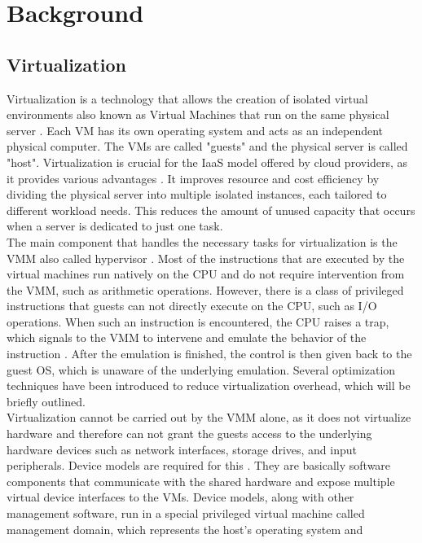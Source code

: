 \chapter{Background}\label{chapter:background}
\section{Virtualization}
Virtualization is a technology that allows the creation of isolated virtual environments also known as 
Virtual Machines that run on the same physical server \cite{virtualization_review}. Each VM has its own 
operating system and acts as an independent physical computer. The VMs are called "guests" and the 
physical server is called "host". Virtualization is crucial for the \ac{IaaS} model offered by 
cloud providers, as it provides various advantages \cite{virtualization_review}. It improves resource and 
cost efficiency by dividing the physical server into multiple isolated instances, each tailored to 
different workload needs. This reduces the amount of unused capacity that occurs when a server is dedicated 
to just one task. \\
The main component that handles the necessary tasks for virtualization is the \ac{VMM} 
also called hypervisor \cite{nitro_whitepaper}. Most of the instructions that are executed by the virtual 
machines run natively on the CPU and do not require intervention from the \acs{VMM}, such as arithmetic 
operations. 
However, there is a class of privileged instructions that guests can not directly execute on the CPU, 
such as I/O operations. When such an instruction is encountered, the CPU raises a 
trap, which signals to the \acs{VMM} to intervene and emulate the behavior of the instruction \cite{nitro_whitepaper}.  
After the emulation is finished, the control is then given back to the guest OS, 
which is unaware of the underlying emulation. Several optimization techniques have been introduced 
to reduce virtualization overhead, which will be briefly outlined. \\
Virtualization cannot be carried out by the VMM alone, as it does not virtualize hardware and therefore 
can not grant the guests access to the underlying hardware devices such as network interfaces, storage drives, 
and input peripherals. Device models are required for this \cite{nitro_whitepaper}. They are basically 
software components that communicate with the shared hardware and expose multiple virtual device 
interfaces to the VMs. Device models, along with other management software, run in a special 
privileged virtual machine called management domain, which represents the host's operating system and 
